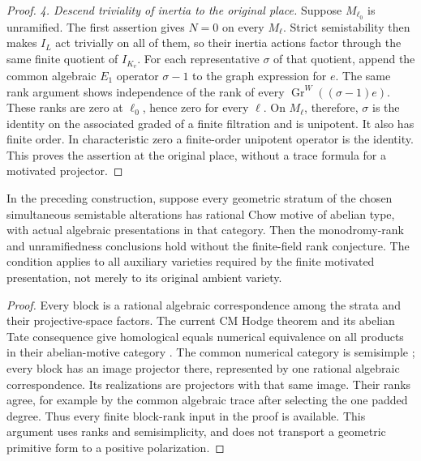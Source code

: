 \begin{proof}
\emph{4. Descend triviality of inertia to the original place.}
Suppose $M_{\ell_0}$ is unramified. The first assertion gives
$N=0$ on every $M_\ell$. Strict semistability then makes
$I_L$ act trivially on all of them, so their inertia actions
factor through the same finite quotient of $I_{K_v}$.
For each representative $\sigma$ of that quotient, append the
common algebraic $E_1$ operator $\sigma-1$ to the graph
expression for $e$. The same rank argument shows independence
of the rank of every $\operatorname{Gr}^W((\sigma-1)e)$.
These ranks are zero at $\ell_0$, hence zero for every $\ell$.
On $M_\ell$, therefore, $\sigma$ is the identity on the
associated graded of a finite filtration and is unipotent.
It also has finite order. In characteristic zero a finite-order
unipotent operator is the identity. This proves the assertion
at the original place, without a trace formula for a motivated
projector.
\end{proof}

\begin{corollary}
\label{c:motivated-abelian-strata-unramified}
In the preceding construction, suppose every geometric stratum
of the chosen simultaneous semistable alterations has rational
Chow motive of abelian type, with actual algebraic presentations
in that category. Then the monodromy-rank and unramifiedness
conclusions hold without the finite-field rank conjecture.
The condition applies to all auxiliary varieties required by
the finite motivated presentation, not merely to its original
ambient variety.
\end{corollary}
\begin{proof}
Every block is a rational algebraic correspondence among the
strata and their projective-space factors.
The current CM Hodge theorem and its abelian Tate consequence
give homological equals numerical equivalence on all products
in their abelian-motive category
\citep[Theorem~I and \S1.1.3]{AvanHoftenSempliner2026}
\citep[Theorem~3.3(a)]{DMilne2002Polarizations}.
The common numerical category is semisimple
\citep[Theorem~1, pp.~448--449]{c_jannsen1992semisimple}; every block has
an image projector there, represented by one rational
algebraic correspondence. Its realizations are projectors
with that same image. Their ranks agree, for example by the
common algebraic trace after selecting the one padded degree.
Thus every finite block-rank input in the proof is available.
This argument uses ranks and semisimplicity, and does not
transport a geometric primitive form to a positive polarization.
\end{proof}

